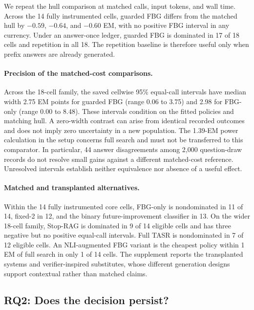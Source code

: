 We repeat the hull comparison at matched calls, input tokens, and wall time.
Across the 14 fully instrumented cells, guarded FBG differs from the matched
hull by $-0.59$, $-0.64$, and $-0.60$ EM, with no positive FBG interval in
any currency. Under an answer-once ledger, guarded FBG is dominated in 17 of
18 cells and repetition in all 18. The repetition baseline is therefore useful
only when prefix answers are already generated.

\paragraph{Precision of the matched-cost comparisons.}
Across the 18-cell family, the saved cellwise 95\% equal-call intervals have
median width 2.75 EM points for guarded FBG (range 0.06 to 3.75) and 2.98 for
FBG-only (range 0.00 to 8.48). These intervals condition on the fitted
policies and matching hull. A zero-width contrast can arise from identical
recorded outcomes and does not imply zero uncertainty in a new population.
The 1.39-EM power calculation in the setup concerns full search and must not be
transferred to this comparator. In particular, 44 answer disagreements among
2,000 question-draw records do not resolve small gains against a different
matched-cost reference. Unresolved intervals establish neither equivalence
nor absence of a useful effect.
\paragraph{Matched and transplanted alternatives.}
Within the 14 fully instrumented core cells, FBG-only is nondominated in 11
of 14, fixed-2 in 12, and the binary future-improvement classifier in 13. On
the wider 18-cell family, Stop-RAG is dominated in 9 of 14 eligible cells and
has three negative but no positive equal-call intervals. Full TASR is
nondominated in 7 of 12 eligible cells. An NLI-augmented FBG variant is the
cheapest policy within 1 EM of full search in only 1 of 14 cells. The
supplement reports the transplanted systems and verifier-inspired substitutes,
whose different generation designs support contextual rather than matched
claims.

\subsection{RQ2: Does the decision persist?}
\label{sec:replication}



